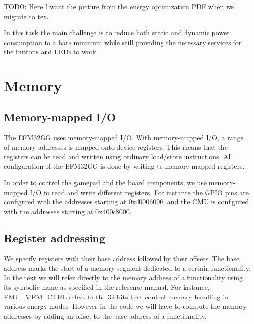TODO: Here I want the picture from the energy optimization PDF when we migrate to tex.

In this task the main challenge is to reduce both static and dynamic power consumption to a bare minimum while still providing the necessary services for the buttons and LEDs to work.



\section{Memory}

\subsection{Memory-mapped I/O}
The EFM32GG uses memory-mapped I/O. With memory-mapped I/O, a range of memory addresses is mapped onto device registers. This means that the registers can be read and written using ordinary load/store instructions. All configuration of the EFM32GG is done by writing to memory-mapped registers.\cite{EFM32GG-RM}

In order to control the gamepad and the board components, we use memory-mapped I/O to read and write different registers. For instance the GPIO pins are configured with the addresses starting at 0x40006000, and the CMU is configured with the addresses starting at 0x400c8000.


\subsection{Register addressing}
We specify registers with their base address followed by their offsets. The base address marks the start of a memory segment dedicated to a certain functionality. In the text we will refer directly to the memory address of a functionality using its symbolic name as specified in the reference manual. For instance, EMU\_MEM\_CTRL refers to the 32 bits that control memory handling in various energy modes. However in the code we will have to compute the memory addresses by adding an offset to the base address of a functionality.



